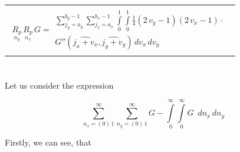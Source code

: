 \documentclass[twoside, 10pt, ptm]{article}
\begin{document}
\begin{multicols}{2}
\begin{center}
\begin{tabular}{ l }
$\begin{array}{lr}
\underset{n_y}{R_{p}}\,\underset{n_x}{R_{p}}\,G =
\begin{array}{c}
 \sum\limits_{j_{y}=a_{y}}^{b_{y} - 1} \sum\limits_{j_{x}=a_{x}}^{b_{x} - 1} \int\limits_{0}^{1} \int\limits_{0}^{1}\frac{1}{4} \left(2 \, v_{y} - 1\right)  \left(2 \, v_{x} - 1\right) \cdot \\
G''\left(\widehat{j_{x} + v_{x}}, \widehat{j_{y} + v_{y}}\right)\,{d v_{x}}\,{d v_{y}}
\end{array}
\end{array}$ \\



\end{tabular}
\end{center}


    \section*{}\label{a-way-of-calculating-deltaleftevright}


\vspace{-3.5mm}


    Let us consider the expression

\begin{equation} \label{eq:12}
\sum\limits_{n_x=\left(0\right)\,1}^{\infty}
\sum\limits_{n_y=\left(0\right)\,1}^{\infty}
G%
-
\int\limits_{0}^{\infty}
\int\limits_{0}^{\infty}
G%
\,\,\,d{n_x}\,d{n_y}
\end{equation}

    Firstly, we can see, that


\end{multicols}
\end{document}
